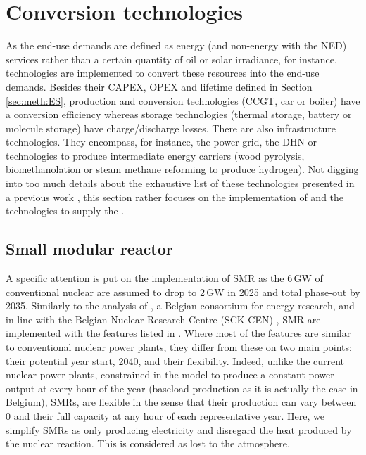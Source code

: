 \section{Conversion technologies}
\label{sec:cs:technologies}
As the end-use demands are defined as energy (and non-energy with the \gls{NED}) services rather than a certain quantity of oil or solar irradiance, for instance, technologies are implemented to convert these resources into the end-use demands. Besides their CAPEX, OPEX and lifetime defined in Section \ref{sec:meth:ES}, production and conversion technologies (\ie \gls{CCGT}, car or boiler) have a conversion efficiency whereas storage technologies (\ie thermal storage, battery or molecule storage) have charge/discharge losses. There are also infrastructure technologies. They encompass, for instance, the power grid, the \gls{DHN} or technologies to produce intermediate energy carriers (\eg wood pyrolysis, biomethanolation or steam methane reforming to produce hydrogen). Not digging into too much details about the exhaustive list of these technologies presented in a previous work \cite{limpens2021generating}, this section rather focuses on the implementation of  and the technologies to supply the .

\subsection{Small modular reactor}
\label{subsec:cs:SMR_tech}

A specific attention is put on the implementation of \gls{SMR} as the 6\,GW of conventional nuclear are assumed to drop to 2\,GW in 2025 and total phase-out by 2035. Similarly to the analysis of \citet{PATHS2050}, a Belgian consortium for energy research, and in line with the Belgian Nuclear Research Centre (SCK-CEN) \cite{SCK-CEN_SMR}, \gls{SMR} are implemented with the features listed in . Where most of the features are similar to conventional nuclear power plants, they differ from these on two main points: their potential year start, 2040, and their flexibility. Indeed, unlike the current nuclear power plants, constrained in the model to produce a constant power output at every hour of the year (\ie baseload production as it is actually the case in Belgium), SMRs, are flexible in the sense that their production can vary between 0 and their full capacity at any hour of each representative year. Here, we simplify SMRs as only producing electricity and disregard the heat produced by the nuclear reaction. This is considered as lost to the atmosphere.

